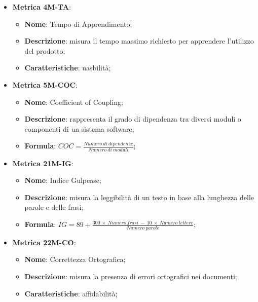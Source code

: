 \begin{itemize}
    \item \textbf{Metrica 4M-TA}:
    \begin{itemize}
        \item \textbf{Nome}: Tempo di Apprendimento;
        \item \textbf{Descrizione}: misura il tempo massimo richiesto per apprendere l'utilizzo del prodotto;
        \item \textbf{Caratteristiche}: uasbilità;
    \end{itemize}
\end{itemize}

\begin{itemize}
    \item \textbf{Metrica 5M-COC}:
    \begin{itemize}
        \item \textbf{Nome}: Coefficient of Coupling;
        \item \textbf{Descrizione}: rappresenta il grado di dipendenza tra diversi moduli o componenti di un sistema software;
        \item \textbf{Formula}: $COC = \frac{Numero\: di\: dipendenze}{Numero\: di\: moduli}$;
    \end{itemize}
\end{itemize}

\begin{itemize}
    \item \textbf{Metrica 21M-IG}:
    \begin{itemize}
        \item \textbf{Nome}: Indice Gulpease;
        \item \textbf{Descrizione}: misura la leggibilità di un testo in base alla lunghezza delle parole e delle frasi;
        \item \textbf{Formula}: $IG = 89 + \frac{300 \:\times \:Numero\:frasi \:- \:10 \:\times\: Numero\:lettere}{Numero\:parole}$;
    \end{itemize}
\end{itemize}

\begin{itemize}
    \item \textbf{Metrica 22M-CO}:
    \begin{itemize}
        \item \textbf{Nome}: Correttezza Ortografica;
        \item \textbf{Descrizione}: misura la presenza di errori ortografici nei documenti;
        \item \textbf{Caratteristiche}: affidabilità;
    \end{itemize}
\end{itemize}

